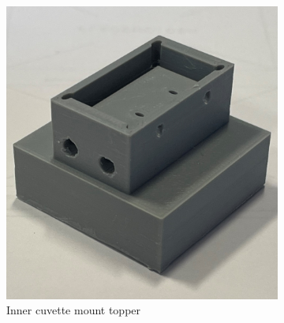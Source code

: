 \begin{figure}[H]
\begin{subfigure}[a]{0.25\textwidth}
    \includegraphics[width=1\linewidth]{Images/Upper_Mount.png}
    \caption{Inner cuvette mount topper}
    \end{subfigure}
    ~
    \begin{subfigure}[a]{0.25\textwidth}
    \centering

\end{subfigure}
\end{figure}

